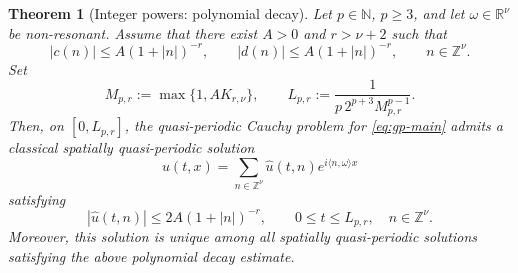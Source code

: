 \documentclass[12pt,reqno,tbtags]{amsart}
\newtheorem{theorem}{Theorem}[section]
\newcommand\1{\mathbbm{1}}
\begin{document}
\begin{theorem}[Integer powers: polynomial decay]\label{thm:gp-poly}
Let $p\in\mathbb N$, $p\ge3$, and let $\omega\in\mathbb R^\nu$ be non-resonant.
Assume that there exist $A>0$ and $r>\nu+2$ such that
\[
|c(n)|\le A(1+|n|)^{-r},
\qquad
|d(n)|\le A(1+|n|)^{-r},
\qquad n\in\mathbb Z^\nu .
\]
Set
\[
M_{p,r}:=\max\{1,AK_{r,\nu}\},
\qquad
L_{p,r}:=
\frac{1}{p\,2^{p+3}M_{p,r}^{p-1}} .
\]
Then, on $[0,L_{p,r}]$, the quasi-periodic Cauchy problem for \eqref{eq:gp-main}
admits a classical spatially quasi-periodic solution
\[
u(t,x)=\sum_{n\in\mathbb Z^\nu}\widehat u(t,n)e^{i\langle n,\omega\rangle x}
\]
satisfying
\[
|\widehat u(t,n)|
\le
2A(1+|n|)^{-r},
\qquad
0\le t\le L_{p,r},\quad n\in\mathbb Z^\nu .
\]
Moreover, this solution is unique among all spatially quasi-periodic solutions
satisfying the above polynomial decay estimate.
\end{theorem}
\end{document}
